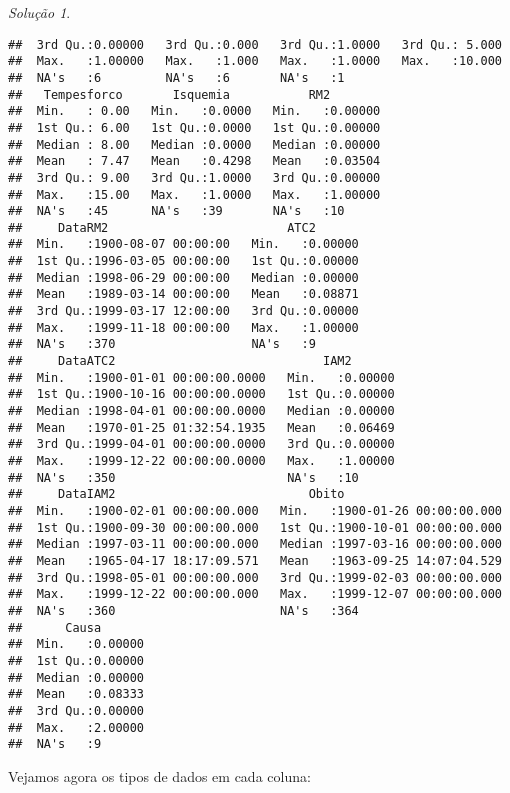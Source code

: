 \documentclass[
]{latex/krantz}
\theoremstyle{definition}
\theoremstyle{definition}
\theoremstyle{definition}
\theoremstyle{definition}
\theoremstyle{remark}
\newtheorem*{solution}{Solução}
\begin{document}
\begin{solution}
\begin{verbatim}
##  3rd Qu.:0.00000   3rd Qu.:0.000   3rd Qu.:1.0000   3rd Qu.: 5.000  
##  Max.   :1.00000   Max.   :1.000   Max.   :1.0000   Max.   :10.000  
##  NA's   :6         NA's   :6       NA's   :1                        
##   Tempesforco       Isquemia           RM2         
##  Min.   : 0.00   Min.   :0.0000   Min.   :0.00000  
##  1st Qu.: 6.00   1st Qu.:0.0000   1st Qu.:0.00000  
##  Median : 8.00   Median :0.0000   Median :0.00000  
##  Mean   : 7.47   Mean   :0.4298   Mean   :0.03504  
##  3rd Qu.: 9.00   3rd Qu.:1.0000   3rd Qu.:0.00000  
##  Max.   :15.00   Max.   :1.0000   Max.   :1.00000  
##  NA's   :45      NA's   :39       NA's   :10       
##     DataRM2                         ATC2        
##  Min.   :1900-08-07 00:00:00   Min.   :0.00000  
##  1st Qu.:1996-03-05 00:00:00   1st Qu.:0.00000  
##  Median :1998-06-29 00:00:00   Median :0.00000  
##  Mean   :1989-03-14 00:00:00   Mean   :0.08871  
##  3rd Qu.:1999-03-17 12:00:00   3rd Qu.:0.00000  
##  Max.   :1999-11-18 00:00:00   Max.   :1.00000  
##  NA's   :370                   NA's   :9        
##     DataATC2                             IAM2        
##  Min.   :1900-01-01 00:00:00.0000   Min.   :0.00000  
##  1st Qu.:1900-10-16 00:00:00.0000   1st Qu.:0.00000  
##  Median :1998-04-01 00:00:00.0000   Median :0.00000  
##  Mean   :1970-01-25 01:32:54.1935   Mean   :0.06469  
##  3rd Qu.:1999-04-01 00:00:00.0000   3rd Qu.:0.00000  
##  Max.   :1999-12-22 00:00:00.0000   Max.   :1.00000  
##  NA's   :350                        NA's   :10       
##     DataIAM2                           Obito                        
##  Min.   :1900-02-01 00:00:00.000   Min.   :1900-01-26 00:00:00.000  
##  1st Qu.:1900-09-30 00:00:00.000   1st Qu.:1900-10-01 00:00:00.000  
##  Median :1997-03-11 00:00:00.000   Median :1997-03-16 00:00:00.000  
##  Mean   :1965-04-17 18:17:09.571   Mean   :1963-09-25 14:07:04.529  
##  3rd Qu.:1998-05-01 00:00:00.000   3rd Qu.:1999-02-03 00:00:00.000  
##  Max.   :1999-12-22 00:00:00.000   Max.   :1999-12-07 00:00:00.000  
##  NA's   :360                       NA's   :364                      
##      Causa        
##  Min.   :0.00000  
##  1st Qu.:0.00000  
##  Median :0.00000  
##  Mean   :0.08333  
##  3rd Qu.:0.00000  
##  Max.   :2.00000  
##  NA's   :9
\end{verbatim}

Vejamos agora os tipos de dados em cada coluna:


\end{solution}
\end{document}

